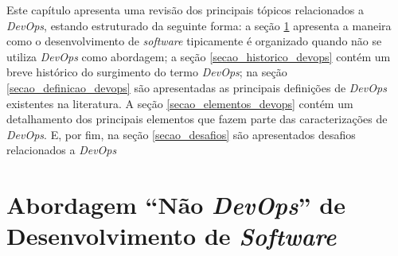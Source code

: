 \newcommand{\texCommand}[1]{\texttt{\textbackslash{#1}}}%

\newcommand{\exemplo}[1]{%
\vspace{\baselineskip}%
\noindent\fbox{\begin{minipage}{\textwidth}#1\end{minipage}}%
\\\vspace{\baselineskip}}%

\newcommand{\exemploVerbatim}[1]{%
\vspace{\baselineskip}%
\noindent\fbox{\begin{minipage}{\textwidth}%
#1\end{minipage}}%
\\\vspace{\baselineskip}}%

Este capítulo apresenta uma revisão dos principais tópicos relacionados a
\textit{DevOps}, estando estruturado da seguinte forma: a seção \ref{secao_abordagem_nao_devops}
apresenta a maneira como o desenvolvimento de \textit{software} tipicamente é
organizado quando não se utiliza \textit{DevOps} como abordagem; a seção \ref{secao_historico_devops}
contém um breve histórico do surgimento do termo \textit{DevOps}; na seção
\ref{secao_definicao_devops} são apresentadas as principais definições de
\textit{DevOps} existentes na literatura. A seção \ref{secao_elementos_devops}
contém um detalhamento dos principais elementos que fazem parte das caracterizações
de \textit{DevOps}. E, por fim, na seção \ref{secao_desafios} são apresentados
desafios relacionados a \textit{DevOps}

\section{Abordagem ``Não \textit{DevOps}'' de Desenvolvimento de \textit{Software}}
\label{secao_abordagem_nao_devops}


